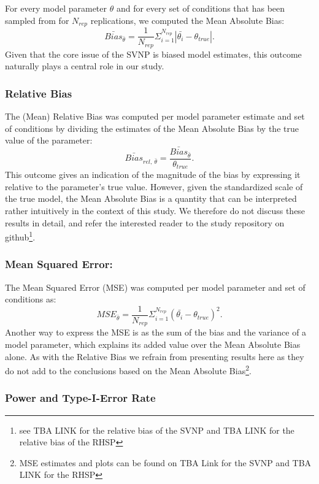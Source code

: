 \documentclass[
  english,
  man, donotrepeattitle,floatsintext]{apa6}
\begin{document}
For every model parameter \(\theta\) and for every set of conditions that has been sampled from for \(N_{rep}\) replications, we computed the Mean Absolute Bias:
\[\bar{Bias}_{\bar{\theta}} = \frac{1}{N_{rep}} \Sigma_{i = 1}^{N_{rep}} |\bar{\theta_i} - \theta_{true}|.\]
Given that the core issue of the SVNP is biased model estimates, this outcome naturally plays a central role in our study.

\hypertarget{relative-bias}{%
\subsubsection{Relative Bias}\label{relative-bias}}

The (Mean) Relative Bias was computed per model parameter estimate and set of conditions by dividing the estimates of the Mean Absolute Bias by the true value of the parameter:
\[\bar{Bias}_{rel, \ \bar{\theta} } = \frac{\bar{Bias}_{\bar{\theta}}}{\theta_{true} }.\]
This outcome gives an indication of the magnitude of the bias by expressing it relative to the parameter's true value. However, given the standardized scale of the true model, the Mean Absolute Bias is a quantity that can be interpreted rather intuitively in the context of this study. We therefore do not discuss these results in detail, and refer the interested reader to the study repository on github\footnote{see TBA LINK for the relative bias of the SVNP and TBA LINK for the relative bias of the RHSP}.

\hypertarget{mean-squared-error}{%
\subsubsection{Mean Squared Error:}\label{mean-squared-error}}

The Mean Squared Error (MSE) was computed per model parameter and set of conditions as:
\[MSE_{\bar{\theta}} = \frac{1}{N_{rep}} \Sigma_{i = 1}^{N_{rep}} (\bar{\theta_i} - \theta_{true})^2.\]
Another way to express the MSE is as the sum of the bias and the variance of a model parameter, which explains its added value over the Mean Absolute Bias alone. As with the Relative Bias we refrain from presenting results here as they do not add to the conclusions based on the Mean Absolute Bias\footnote{MSE estimates and plots can be found on TBA Link for the SVNP and TBA LINK for the RHSP}.

\hypertarget{power-and-type-i-error-rate}{%
\subsubsection{Power and Type-I-Error Rate}\label{power-and-type-i-error-rate}}
\end{document}
